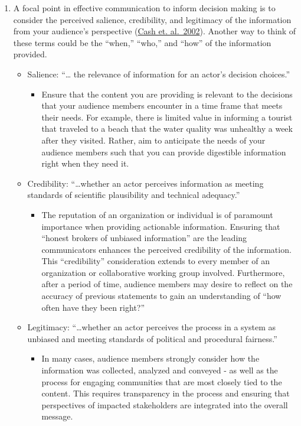 \documentclass[
]{book}
\providecommand{\tightlist}{%
  \setlength{\itemsep}{0pt}\setlength{\parskip}{0pt}}
\begin{document}
\begin{enumerate}
\def\labelenumi{\arabic{enumi}.}
\tightlist
\item
  A focal point in effective communication to inform decision making is to consider the perceived salience, credibility, and legitimacy of the information from your audience's perspective (\href{https://dash.harvard.edu/bitstream/handle/1/32067415/Salience_credibility.pdf?sequence=4}{Cash et. al.~2002}). Another way to think of these terms could be the ``when,'' ``who,'' and ``how'' of the information provided.

  \begin{itemize}
  \tightlist
  \item
    Salience: ``\ldots{} the relevance of information for an actor's decision choices.''

    \begin{itemize}
    \tightlist
    \item
      Ensure that the content you are providing is relevant to the decisions that your audience members encounter in a time frame that meets their needs. For example, there is limited value in informing a tourist that traveled to a beach that the water quality was unhealthy a week after they visited. Rather, aim to anticipate the needs of your audience members such that you can provide digestible information right when they need it.
    \end{itemize}
  \item
    Credibility: ``\ldots whether an actor perceives information as meeting standards of scientific plausibility and technical adequacy.''

    \begin{itemize}
    \tightlist
    \item
      The reputation of an organization or individual is of paramount importance when providing actionable information. Ensuring that ``honest brokers of unbiased information'' are the leading communicators enhances the perceived credibility of the information. This ``credibility'' consideration extends to every member of an organization or collaborative working group involved. Furthermore, after a period of time, audience members may desire to reflect on the accuracy of previous statements to gain an understanding of ``how often have they been right?''
    \end{itemize}
  \item
    Legitimacy: ``\ldots whether an actor perceives the process in a system as unbiased and meeting standards of political and procedural fairness.''

    \begin{itemize}
    \tightlist
    \item
      In many cases, audience members strongly consider how the information was collected, analyzed and conveyed - as well as the process for engaging communities that are most closely tied to the content. This requires transparency in the process and ensuring that perspectives of impacted stakeholders are integrated into the overall message.
    \end{itemize}
  \end{itemize}
\end{enumerate}
\end{document}
